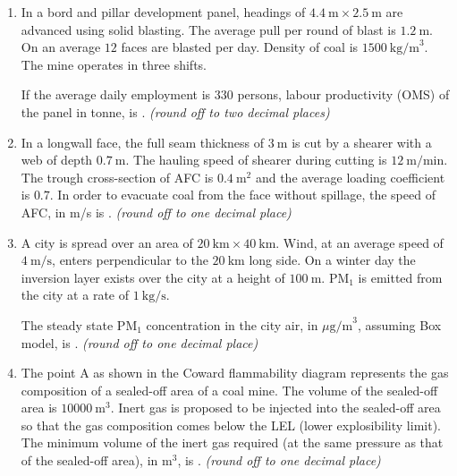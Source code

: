 \documentclass[journal,12pt,onecolumn]{IEEEtran}
\theoremstyle{remark}
\begin{document}
\begin{enumerate}
\item In a bord and pillar development panel, headings of $4.4 \ \text{m} \times 2.5 \ \text{m}$ are advanced using solid blasting.  
The average pull per round of blast is $1.2 \ \text{m}$. On an average $12$ faces are blasted per day.  
Density of coal is $1500 \ \text{kg/m}^3$. The mine operates in three shifts.  

If the average daily employment is $330$ persons, labour productivity (OMS) of the panel in tonne, is \underline{\hspace{1.5cm}}.  
\textit{(round off to two decimal places)} 

\hfill{}
\item In a longwall face, the full seam thickness of $3 \ \text{m}$ is cut by a shearer with a web of depth $0.7 \ \text{m}$.  
The hauling speed of shearer during cutting is $12 \ \text{m/min}$.  
The trough cross-section of AFC is $0.4 \ \text{m}^2$ and the average loading coefficient is $0.7$.  
In order to evacuate coal from the face without spillage, the speed of AFC, in m/s is \underline{\hspace{1.5cm}}.  
\textit{(round off to one decimal place)} 


\hfill{}
\item A city is spread over an area of $20 \ \text{km} \times 40 \ \text{km}$.  
Wind, at an average speed of $4 \ \text{m/s}$, enters perpendicular to the $20 \ \text{km}$ long side.  
On a winter day the inversion layer exists over the city at a height of $100 \ \text{m}$.  
PM$_1$ is emitted from the city at a rate of $1 \ \text{kg/s}$.  

The steady state PM$_1$ concentration in the city air, in $\mu \text{g/m}^3$, assuming Box model, is \underline{\hspace{1.5cm}}.  
\textit{(round off to one decimal place)}  

\hfill{}
\item  The point A as shown in the Coward flammability diagram represents the gas composition of a sealed-off area of a coal mine.  
The volume of the sealed-off area is $10000 \ \text{m}^3$.  
Inert gas is proposed to be injected into the sealed-off area so that the gas composition comes below the LEL (lower explosibility limit).  
The minimum volume of the inert gas required (at the same pressure as that of the sealed-off area), in $\text{m}^3$, is \underline{\hspace{1.5cm}}.  
\textit{(round off to one decimal place)}  



\end{enumerate}
\end{document}
